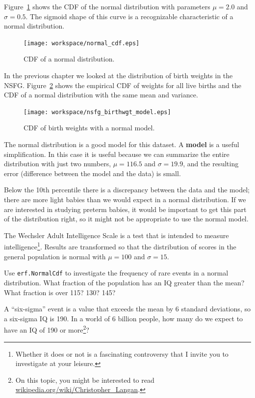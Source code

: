 \documentclass[12pt]{book}
\begin{document}
Figure~\ref{normal_cdf} shows the CDF of the normal distribution
with parameters $\mu=2.0$ and $\sigma=0.5$.  The sigmoid shape of
this curve is a recognizable characteristic of a normal distribution.

\begin{figure}
\centerline{\texttt{[image: workspace/normal\_cdf.eps]}}
\caption{CDF of a normal distribution.}
\label{normal_cdf}
\end{figure}

In the previous chapter we looked at the distribution of birth
weights in the NSFG.  Figure~\ref{nsfg_birthwgt_model} shows the
empirical CDF of weights for all live births and the CDF of
a normal distribution with the same mean and variance.

\begin{figure}
\centerline{\texttt{[image: workspace/nsfg\_birthwgt\_model.eps]}}
\caption{CDF of birth weights with a normal model.}
\label{nsfg_birthwgt_model}
\end{figure}

The normal distribution is a good model for this dataset.  A {\bf
  model} is a useful simplification.  In this case it is useful
because we can summarize the entire distribution with just two
numbers, $\mu=116.5$ and $\sigma=19.9$, and the resulting error
(difference between the model and the data) is small.

Below the 10th percentile there is a discrepancy between the data
and the model; there are more light babies than we would expect in
a normal distribution.  If we are interested in studying preterm
babies, it would be important to get this part of the distribution
right, so it might not be appropriate to use the normal
model.

\begin{ex}

The Wechsler Adult Intelligence Scale is a test that is intended
to measure intelligence\footnote{Whether it does or not is a
fascinating controversy that I invite you to investigate at your
leisure.}.  Results are transformed so that the distribution of scores
in the general population is normal with $\mu=100$ and $\sigma=15$.

Use {\tt erf.NormalCdf} to investigate the frequency of rare events in
a normal distribution.  What fraction of the population has an IQ
greater than the mean?  What fraction is over 115?  130?  145?

A ``six-sigma'' event is a value that exceeds the mean by 6 standard
deviations, so a six-sigma IQ is 190.  In a world of 6 billion people,
how many do we expect to have an IQ of 190 or more\footnote{On this
  topic, you might be interested to read
  \url{wikipedia.org/wiki/Christopher_Langan}.}?

\end{ex}
\end{document}

